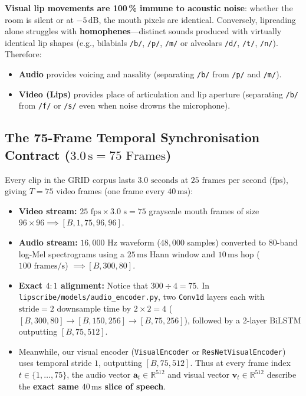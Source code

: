 \documentclass[11pt,a4paper]{article}
\newcommand{\code}[1]{\texttt{\small #1}}
\begin{document}
\textbf{Visual lip movements are 100\,\% immune to acoustic noise}: whether the room is silent or at $-5\,\text{dB}$, the mouth pixels are identical. Conversely, lipreading alone struggles with \textbf{homophenes}---distinct sounds produced with virtually identical lip shapes (e.g., bilabials \code{/b/}, \code{/p/}, \code{/m/} or alveolars \code{/d/}, \code{/t/}, \code{/n/}). Therefore:
\begin{itemize}
  \item \textbf{Audio} provides voicing and nasality (separating \code{/b/} from \code{/p/} and \code{/m/}).
  \item \textbf{Video (Lips)} provides place of articulation and lip aperture (separating \code{/b/} from \code{/f/} or \code{/s/} even when noise drowns the microphone).
\end{itemize}

\subsection{The 75-Frame Temporal Synchronisation Contract ($3.0\,\text{s} = 75\text{ Frames}$)}
Every clip in the GRID corpus lasts $3.0\text{ seconds}$ at $25\text{ frames per second (fps)}$, giving $T = 75$ video frames (one frame every $40\,\text{ms}$):
\begin{itemize}
  \item \textbf{Video stream:} $25\text{ fps} \times 3.0\text{ s} = 75$ grayscale mouth frames of size $96 \times 96 \implies [B, 1, 75, 96, 96]$.
  \item \textbf{Audio stream:} $16{,}000\text{ Hz}$ waveform ($48{,}000$ samples) converted to 80-band log-Mel spectrograms using a $25\,\text{ms}$ Hann window and $10\,\text{ms}$ hop ($100\text{ frames/s}$) $\implies [B, 300, 80]$.
  \item \textbf{Exact $4:1$ alignment:} Notice that $300 \div 4 = 75$. In \code{lipscribe/models/audio\_encoder.py}, two \code{Conv1d} layers each with $\text{stride}=2$ downsample time by $2 \times 2 = 4$ ($[B, 300, 80] \to [B, 150, 256] \to [B, 75, 256]$), followed by a 2-layer BiLSTM outputting $[B, 75, 512]$.
  \item Meanwhile, our visual encoder (\code{VisualEncoder} or \code{ResNetVisualEncoder}) uses temporal stride $1$, outputting $[B, 75, 512]$. Thus at every frame index $t \in \{1,\dots,75\}$, the audio vector $\mathbf{a}_t \in \mathbb{R}^{512}$ and visual vector $\mathbf{v}_t \in \mathbb{R}^{512}$ describe the \textbf{exact same $40\,\text{ms}$ slice of speech}.
\end{itemize}
\end{document}
